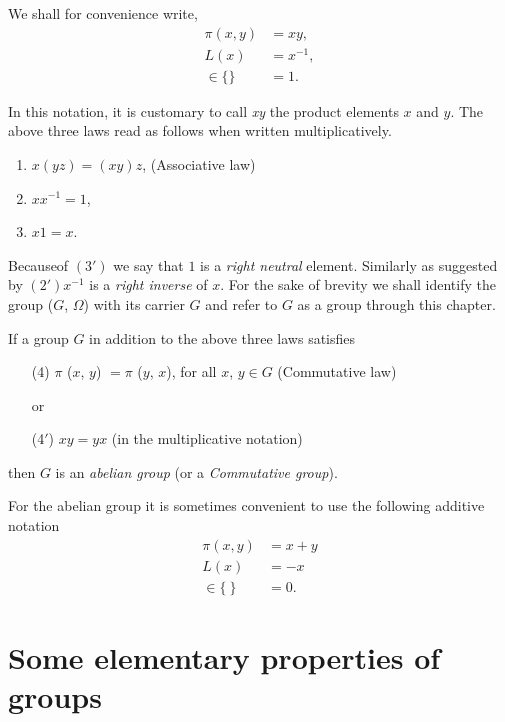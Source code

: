 We shall for convenience write, 
\begin{align*}
  \pi (x, y) & = xy,\\
  L (x) &= x^{-1}, \\
  \in  \{ \} & = 1.
\end{align*} 

In this notation, it is customary to call \textit{xy} the product
elements $x$ and $y$. The above three laws read as follows when
written multiplicatively. 
\begin{enumerate}[(1$'$)]
\item $x (yz) = (xy) z$, \quad (Associative law)
\item $xx^{-1} = 1$,
\item $x1 = x$.
\end{enumerate}

Because\pageoriginale of $(3')$ we say that $1$ is a \textit{right neutral }
element. Similarly as suggested by $(2') x^{-1}$ is a \textit{right
  inverse} of $x$. For the sake of brevity we shall identify the group
($G$, $\Omega$) with its carrier $G$ and refer to $G$ as a group
through this chapter. 

If a group $G$ in addition to the above three laws satisfies 
\begin{enumerate}
\item[(4)] $\pi$ ($x$, $y$) $= \pi$ ($y$, $x$), for all $x$, $y \in 
  G$ (Commutative law)  

  or
  
\item[(4$'$)] $xy= yx$ (in the multiplicative notation)
\end{enumerate}  
then $G$ is an \textit{abelian group} (or a \textit{Commutative group}).

For the abelian group it is sometimes convenient to use the following
additive notation 
\begin{align*}
  \pi (x,y) &= x+ y\\
  L (x) & = -x\\
  \in  \{ ~\} & = 0.
\end{align*}

\section{Some elementary properties of groups}\label{chap1:sec3} %

